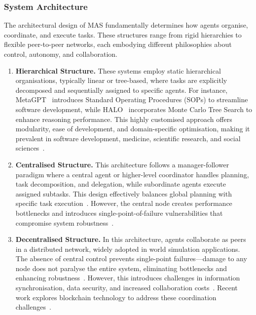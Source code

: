 \documentclass[]{selfevolagent}
\theoremstyle{plain}
\theoremstyle{definition}
\theoremstyle{remark}
\begin{document}
\subsubsection{System Architecture}
The architectural design of MAS fundamentally determines how agents organise, coordinate, and execute tasks. These structures range from rigid hierarchies to flexible peer-to-peer networks, each embodying different philosophies about control, autonomy, and collaboration.
\begin{enumerate}[label=(\arabic*)]
    \item \textbf{Hierarchical Structure.} These systems employ static hierarchical organisations, typically linear or tree-based, where tasks are explicitly decomposed and sequentially assigned to specific agents. For instance, MetaGPT~\citep{hong2023metagpt} introduces Standard Operating Procedures (SOPs) to streamline software development, while HALO~\citep{hou2025halohierarchicalautonomouslogicoriented} incorporates Monte Carlo Tree Search to enhance reasoning performance. This highly customised approach offers modularity, ease of development, and domain-specific optimisation, making it prevalent in software development, medicine, scientific research, and social sciences~\citep{zheng2023chatgpt,park2023generativeagentsinteractivesimulacra,qian2024chatdevcommunicativeagentssoftware,li2024agent,cheng2025hawkhierarchicalworkflowframework}. 
    \item \textbf{Centralised Structure.} This architecture follows a manager-follower paradigm where a central agent or higher-level coordinator handles planning, task decomposition, and delegation, while subordinate agents execute assigned subtasks. This design effectively balances global planning with specific task execution~\citep{fourney2024magenticonegeneralistmultiagentsolving,smolagents,camel_workforce_docs}. However, the central node creates performance bottlenecks and introduces single-point-of-failure vulnerabilities that compromise system robustness~\citep{ko2025sevensecuritychallengessolved}.
    
   \item \textbf{Decentralised Structure.} In this architecture, agents collaborate as peers in a distributed network, widely adopted in world simulation applications. The absence of central control prevents single-point failures—damage to any node does not paralyse the entire system, eliminating bottlenecks and enhancing robustness~\citep{lu2024morphagentempoweringagentsselfevolving,yang2025agentnetdecentralizedevolutionarycoordination}. However, this introduces challenges in information synchronisation, data security, and increased collaboration costs~\citep{ko2025sevensecuritychallengessolved}. Recent work explores blockchain technology to address these coordination challenges~\citep{geren2024blockchainlargelanguagemodel,10.5555/3709347.3744042}.
\end{enumerate}
\end{document}
